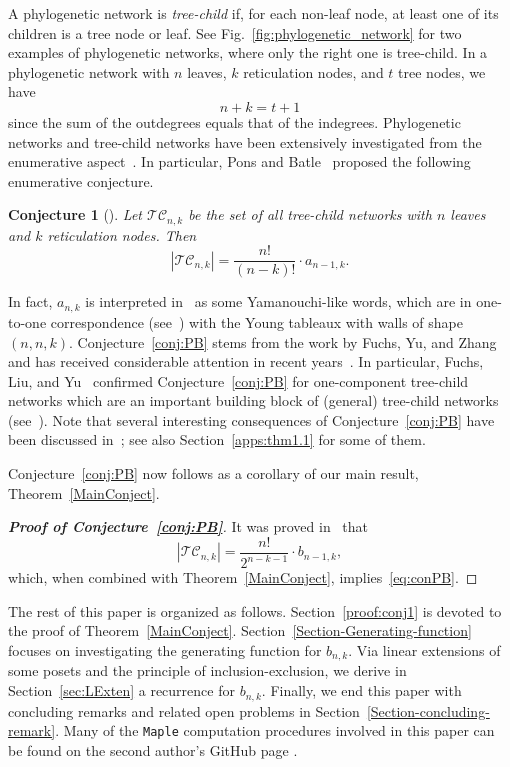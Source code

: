 \documentclass[reqno, 12pt]{article}
\newtheorem{cnj}[thm]{Conjecture}
\theoremstyle{mydefinition}
\theoremstyle{myremark}
\numberwithin{algorithm}{section}
\begin{document}
A phylogenetic network is {\em tree-child} if, for each non-leaf node, at least one of its
children is a tree node or leaf.
See Fig.~\ref{fig:phylogenetic_network} for two examples of phylogenetic networks, where only the right one is tree-child. In a phylogenetic network with $n$ leaves, $k$ reticulation nodes, and $t$ tree nodes, we have
$$n+k=t+1$$
since the sum of the outdegrees equals that of the indegrees.
Phylogenetic networks and tree-child networks have been extensively investigated from the enumerative aspect~\cite{Bouvel,CFY,CFLWY,CZ,FLY,FYZ,FYZ0,PB}. In particular, Pons and Batle~\cite{PB} proposed the following enumerative conjecture.

\begin{cnj}[] \label{Pons-Batle}
\label{conj:PB}
Let $\mathcal{TC}_{n,k}$ be the set of all  tree-child networks with $n$ leaves and $k$ reticulation nodes. Then
\begin{equation}\label{eq:conPB}
|\mathcal{TC}_{n,k}|=\frac{n!}{(n-k)!}\cdot a_{n-1,k}.
\end{equation}
\end{cnj}


In fact, $a_{n,k}$ is interpreted in~\cite{PB} as some Yamanouchi-like  words, which are in one-to-one correspondence (see~\cite[Proposition~7.10.3~(d)]{RP.Stanley2024}) with the  Young tableaux with walls of shape $(n,n,k)$. Conjecture~\ref{conj:PB} stems from the work by Fuchs, Yu, and Zhang~\cite{FYZ} and has received considerable attention in recent years~\cite{CFLWY, FLY}. In particular, Fuchs, Liu, and Yu~\cite{FLY} confirmed Conjecture~\ref{conj:PB}  for one-component tree-child
networks which are an important building block of (general) tree-child networks (see~\cite{CZ}). Note that  several interesting consequences of Conjecture~\ref{conj:PB} have been discussed in~\cite{PB,CZ}; see also Section~\ref{apps:thm1.1} for some of them.

Conjecture~\ref{conj:PB} now follows as a corollary of our main result,  Theorem~\ref{MainConject}.
\begin{proof}[{\bf Proof of Conjecture~\ref{conj:PB}}]
It was proved in~\cite[Theorem~3.4]{CFLWY} that
$$
|\mathcal{TC}_{n,k}|=\frac{n!}{2^{n-k-1}}\cdot b_{n-1,k},
$$
which,  when combined with  Theorem~\ref{MainConject},  implies~\eqref{eq:conPB}.
\end{proof}


The rest of this paper is organized as follows.
Section~\ref{proof:conj1} is devoted to the proof of Theorem~\ref{MainConject}.
Section~\ref{Section-Generating-function} focuses on investigating the generating function for $b_{n,k}$.  Via linear extensions of some posets and the principle of inclusion-exclusion, we derive in Section~\ref{sec:LExten} a recurrence for $b_{n,k}$.
Finally, we end this paper with concluding remarks and related open problems in Section~\ref{Section-concluding-remark}.
Many of the \texttt{Maple} computation procedures involved in this paper can be found on the second author's GitHub page \cite{MapleTC}.
\end{document}
